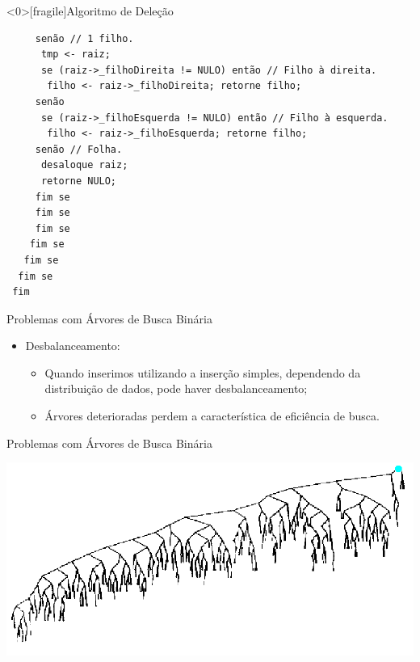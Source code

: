 \documentclass[12pt,table,xcolor={dvipsnames}]{beamer}
\begin{document}
\begin{frame}<0>[fragile]{Algoritmo de Deleção}
          \begin{lstlisting}
     senão // 1 filho.
      tmp <- raiz;
      se (raiz->_filhoDireita != NULO) então // Filho à direita.
       filho <- raiz->_filhoDireita; retorne filho;
     senão
      se (raiz->_filhoEsquerda != NULO) então // Filho à esquerda.
       filho <- raiz->_filhoEsquerda; retorne filho;
     senão // Folha.
      desaloque raiz;
      retorne NULO;
     fim se 
     fim se
     fim se
    fim se 
   fim se
  fim se
 fim\end{lstlisting}
\end{frame} 

\begin{frame}[fragile]{Problemas com Árvores de Busca Binária}
          \begin{itemize}
          \item Desbalanceamento:
		  \begin{itemize}
		  \item Quando inserimos utilizando a inserção simples, dependendo da distribuição de dados, pode haver desbalanceamento;
		  \item Árvores deterioradas perdem a característica de eficiência de busca.
		  \end{itemize}
       	  \end{itemize}
\end{frame}

\begin{frame}[fragile]{Problemas com Árvores de Busca Binária}
\begin{center}
\includegraphics[scale=.35]{deter1.png} 
\end{center}
\end{frame}
\end{document}
